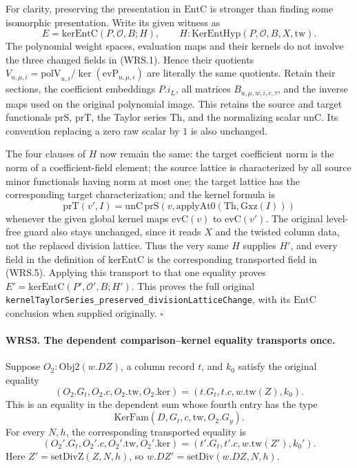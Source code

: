 For clarity, preserving the presentation in \(\mathrm{EntC}\) is
stronger than finding some isomorphic presentation.  Write its given
witness as
\[
 E=\mathrm{kerEntC}(P,\mathcal O,B;H),
 \qquad H:\mathrm{KerEntHyp}(P,\mathcal O,B,X,\mathrm{tw}).
 \tag{WRS.5}
\]
The polynomial weight spaces, evaluation maps and their kernels do
not involve the three changed fields in (WRS.1).  Hence their quotients
\(V_{u,\mu,i}=\mathrm{polV}_{u,i}/\ker(\mathrm{evP}_{u,\mu,i})\)
are literally the same quotients.  Retain their sections, the
coefficient embeddings \(P.i_L\), all matrices \(B_{u,\mu,w,i,c,\tau}\),
and the inverse maps used on the original polynomial image.  This
retains the source and target functionals \(\mathrm{prS}\),
\(\mathrm{prT}\), the Taylor series \(\mathrm{Th}\), and the
normalizing scalar \(\mathrm{unC}\).  Its convention replacing a
zero raw scalar by \(1\) is also unchanged.

The four clauses of \(H\) now remain the same: the target
coefficient norm is the norm of a coefficient-field element; the
source lattice is characterized by all source minor functionals
having norm at most one; the target lattice has the corresponding
target characterization; and the kernel formula is
\[
 \mathrm{prT}(v',I)=\mathrm{unC}\,
 \mathrm{prS}\!\left(v,
       \mathrm{applyAt0}(\mathrm{Th},\mathrm{Gxz}(I))\right)
 \tag{WRS.6}
\]
whenever the given global kernel maps \(\mathrm{evC}(v)\) to
\(\mathrm{evC}(v')\).  The original level-free guard also stays
unchanged, since it reads \(X\) and the twisted column data, not
the replaced division lattice.  Thus the very same \(H\) supplies
\(H'\), and every field in the definition of \(\mathrm{kerEntC}\)
is the corresponding transported field in (WRS.5).
Applying this transport to that one equality proves
\(E'=\mathrm{kerEntC}(P',\mathcal O',B;H')\).
This proves the full original
\texttt{kernelTaylorSeries\_preserved\_divisionLatticeChange},
with its \(\mathrm{EntC}\) conclusion when supplied originally.
\hfill\(\square\)

\paragraph{WRS3. The dependent comparison--kernel equality transports once.}
\label{claim:WRS3}
Suppose \(O_2:\mathrm{Obj2}(w.DZ)\), a column record \(t\), and
\(k_0\) satisfy the original equality
\[
 (O_2.G_t,O_2.c,O_2.\mathrm{tw},O_2.\mathrm{ker})
    =(t.G_t,t.c,w.\mathrm{tw}(Z),k_0).                \tag{WRS.7}
\]
This is an equality in the dependent sum whose fourth entry has
the type
\[
              \mathrm{KerFam}(D,G_t,c,\mathrm{tw},O_2.G_y).
\]
For every \(N,h\), the corresponding transported equality is
\[
 (O_2'.G_t,O_2'.c,O_2'.\mathrm{tw},O_2'.\mathrm{ker})
    =(t'.G_t,t'.c,w.\mathrm{tw}(Z'),k_0').            \tag{WRS.8}
\]
Here \(Z'=\mathrm{setDivZ}(Z,N,h)\), so
\(w.DZ'=\mathrm{setDiv}(w.DZ,N,h)\).

